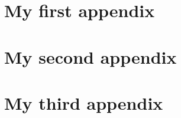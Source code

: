 \documentclass[12pt,ngerman,parskip=half]{scrbook}
\begin{document}







\blindtext[100]



\begin{appendices}
    \section{My first appendix}
    \blindtext
    \section{My second appendix}
    \blindtext

    \section{My third appendix}
    \blindtext

\end{appendices}



\printbibliography

\printbibliography[title={Artikel},type=article]

\printbibliography[title={Bücher},type=book]
\end{document}
